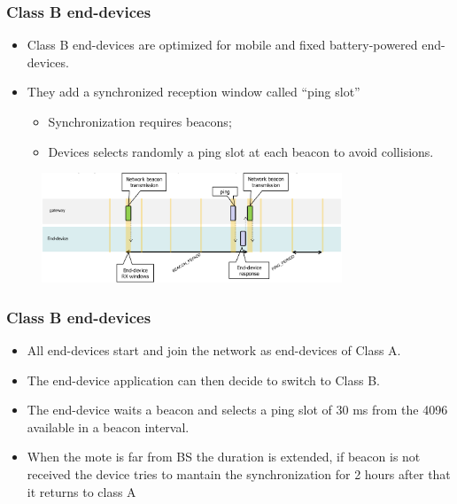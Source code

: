 \begin{frame}[fragile]
  \frametitle{Class B end-devices}
  \begin{itemize}
		\item Class B end-devices are optimized for mobile and fixed battery-powered end-devices.
		\item They add a synchronized reception window called ``ping slot''
		\begin{itemize}
			\item Synchronization requires beacons;
			\item Devices selects randomly a ping slot at each beacon to avoid collisions.
		\end{itemize}
	\end{itemize}
	\begin{figure}
		\centering
		\includegraphics[width=0.8\textwidth]{img/loraBeacon.png}
	\end{figure}
\end{frame}

\begin{frame}[fragile]
  \frametitle{Class B end-devices}
  \begin{itemize}
		\item All end-devices start and join the network as end-devices of Class A.
		\item The end-device application can then decide to switch to Class B.
		\item The end-device waits a beacon and selects a ping slot of 30 ms from the 4096 available in a beacon interval.
		\item When the mote is far from BS the duration is extended, if beacon is not received the device tries to mantain the synchronization for 2 hours after that it returns to class A
  \end{itemize}
\end{frame}

